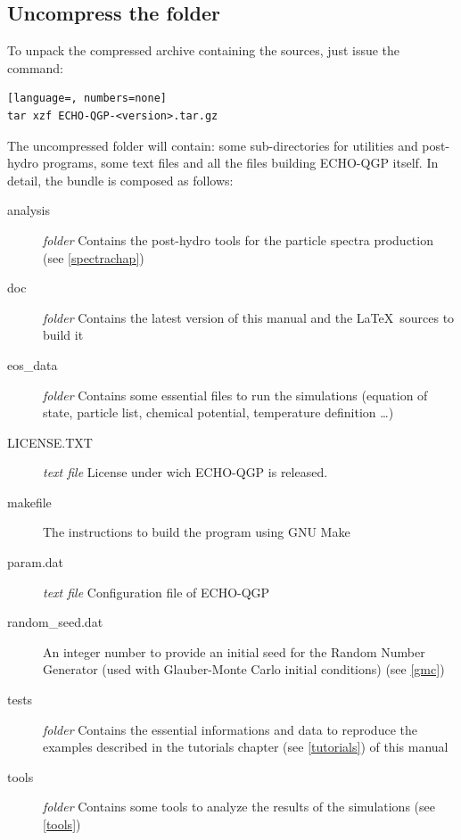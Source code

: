 \subsection{Uncompress the folder}
To unpack the compressed archive containing the sources, just issue the command:
\begin{lstlisting}[language=, numbers=none]
tar xzf ECHO-QGP-<version>.tar.gz
\end{lstlisting}
The uncompressed folder will contain: some sub-directories for utilities and post-hydro programs, 
some text files and all the files building ECHO-QGP itself. In detail, the bundle is composed as follows: 
\begin{description}
 \item[analysis] \textit{folder} Contains the post-hydro tools for the particle spectra production (see \ref{spectrachap})
 \item[doc] \textit{folder} Contains the latest version of this manual and the \LaTeX$\,$ sources to build it
 \item[eos\_data] \textit{folder} Contains some essential files to run the simulations (equation of state, particle list, chemical potential, temperature definition \dots)
 \item[LICENSE.TXT] \textit{text file} License under wich ECHO-QGP is released.
 \item[makefile] The instructions to build the program using GNU Make
 \item[param.dat] \textit{text file} Configuration file of ECHO-QGP
 \item[random\_seed.dat] An integer number to provide an initial seed for the Random Number Generator (used with Glauber-Monte Carlo initial conditions) (see \ref{gmc})
 \item[tests] \textit{folder} Contains the essential informations and data to reproduce the examples described in the tutorials chapter (see \ref{tutorials}) of this manual
 \item[tools] \textit{folder} Contains some tools to analyze the results of the simulations (see \ref{tools})
 \end{description}
 
